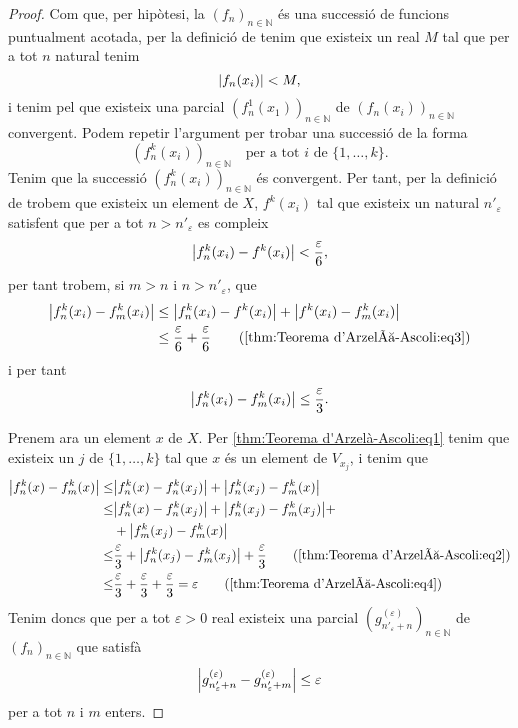 \documentclass[../Apunts.tex]{subfiles}
\begin{document}
\begin{lemma}
\begin{proof}
			Com que, per hipòtesi, la \((f_{n})_{n\in\mathbb{N}}\) és una successió de funcions puntualment acotada, per la definició de  tenim que existeix un real \(M\) tal que per a tot \(n\) natural tenim
			\[\norm{f_{n}(x_{i})}<M,\]
			i tenim pel  que existeix una parcial \((f_{n}^{1}(x_{1}))_{n\in\mathbb{N}}\) de \((f_{n}(x_{i}))_{n\in\mathbb{N}}\) convergent. Podem repetir l'argument per trobar una successió de la forma
			\[(f^{k}_{n}(x_{i}))_{n\in\mathbb{N}}\quad\text{per a tot }i\text{ de }\{1,\dots,k\}.\]
			Tenim que la successió \((f^{k}_{n}(x_{i}))_{n\in\mathbb{N}}\) és convergent. Per tant, per la definició de  trobem que existeix un element de \(X\), \(f^{k}(x_{i})\) tal que existeix un natural \(n'_{\varepsilon}\) satisfent que per a tot \(n>n'_{\varepsilon}\) es compleix
			\begin{equation}
				\label{thm:Teorema d'Arzelà-Ascoli:eq3}
				\norm{f^{k}_{n}(x_{i})-f^{k}(x_{i})}<\frac{\varepsilon}{6},
			\end{equation}
			per tant trobem, si \(m>n\) i \(n>n'_{\varepsilon}\), que
			\begin{align*}
				\norm{f^{k}_{n}(x_{i})-f^{k}_{m}(x_{i})}&\leq\norm{f^{k}_{n}(x_{i})-f^{k}(x_{i})}+\norm{f^{k}(x_{i})-f^{k}_{m}(x_{i})} \\
				&\leq\frac{\varepsilon}{6}+\frac{\varepsilon}{6} \tag{\ref{thm:Teorema d'Arzelà-Ascoli:eq3}}
			\end{align*}
			i per tant
			\begin{equation}
				\label{thm:Teorema d'Arzelà-Ascoli:eq4}
				\norm{f^{k}_{n}(x_{i})-f^{k}_{m}(x_{i})}\leq\frac{\varepsilon}{3}.
			\end{equation}
			
			Prenem ara un element \(x\) de \(X\). Per \eqref{thm:Teorema d'Arzelà-Ascoli:eq1} tenim que existeix un \(j\) de \(\{1,\dots,k\}\) tal que \(x\) és un element de \(V_{x_{j}}\), i tenim que
			\begin{align*}
				\norm{f^{k}_{n}(x)-f^{k}_{m}(x)}\leq&\norm{f^{k}_{n}(x)-f^{k}_{n}(x_{j})}+\norm{f^{k}_{n}(x_{j})-f^{k}_{m}(x)} \\
				\leq&\norm{f^{k}_{n}(x)-f^{k}_{n}(x_{j})}+\norm{f^{k}_{n}(x_{j})-f^{k}_{m}(x_{j})}+\\&+\norm{f^{k}_{m}(x_{j})-f^{k}_{m}(x)} \\
				\leq&\frac{\varepsilon}{3}+\norm{f^{k}_{n}(x_{j})-f^{k}_{m}(x_{j})}+\frac{\varepsilon}{3}\tag{\ref{thm:Teorema d'Arzelà-Ascoli:eq2}} \\
				\leq&\frac{\varepsilon}{3}+\frac{\varepsilon}{3}+\frac{\varepsilon}{3}=\varepsilon\tag{\ref{thm:Teorema d'Arzelà-Ascoli:eq4}}
			\end{align*}
			Tenim doncs que per a tot \(\varepsilon>0\) real existeix una parcial \((g^{(\varepsilon)}_{n'_{\varepsilon}+n})_{n\in\mathbb{N}}\) de \((f_{n})_{n\in\mathbb{N}}\) que satisfà
			\[\norm{g^{(\varepsilon)}_{n'_{\varepsilon}+n}-g^{(\varepsilon)}_{n'_{\varepsilon}+m}}\leq\varepsilon\]
			per a tot \(n\) i \(m\) enters.
			

\end{proof}
\end{lemma}
\end{document}
